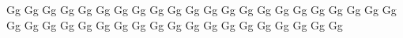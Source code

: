 \documentclass{worksheet}
\begin{document}
\begin{drillsheet}
\calligra
Gg Gg Gg Gg Gg Gg Gg Gg Gg Gg Gg Gg Gg Gg Gg Gg Gg Gg Gg Gg Gg Gg Gg Gg Gg Gg Gg Gg Gg Gg Gg Gg Gg Gg Gg Gg Gg Gg Gg Gg Gg
\end{drillsheet}
\end{document}

